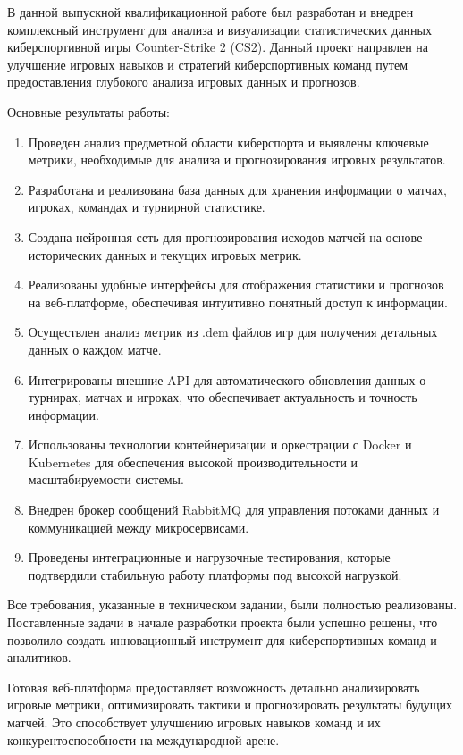 \newsection
{}

В данной выпускной квалификационной работе был разработан и внедрен комплексный инструмент для анализа и визуализации статистических данных киберспортивной игры Counter-Strike 2 (CS2). Данный проект направлен на улучшение игровых навыков и стратегий киберспортивных команд путем предоставления глубокого анализа игровых данных и прогнозов.

Основные результаты работы:

\begin{enumerate}
	\item Проведен анализ предметной области киберспорта и выявлены ключевые метрики, необходимые для анализа и прогнозирования игровых результатов.
	\item Разработана и реализована база данных для хранения информации о матчах, игроках, командах и турнирной статистике.
	\item Создана нейронная сеть для прогнозирования исходов матчей на основе исторических данных и текущих игровых метрик.
	\item Реализованы удобные интерфейсы для отображения статистики и прогнозов на веб-платформе, обеспечивая интуитивно понятный доступ к информации.
	\item Осуществлен анализ метрик из .dem файлов игр для получения детальных данных о каждом матче.
	\item Интегрированы внешние API для автоматического обновления данных о турнирах, матчах и игроках, что обеспечивает актуальность и точность информации.
	\item Использованы технологии контейнеризации и оркестрации с Docker и Kubernetes для обеспечения высокой производительности и масштабируемости системы.
	\item Внедрен брокер сообщений RabbitMQ для управления потоками данных и коммуникацией между микросервисами.
	\item Проведены интеграционные и нагрузочные тестирования, которые подтвердили стабильную работу платформы под высокой нагрузкой.
\end{enumerate}

Все требования, указанные в техническом задании, были полностью реализованы. Поставленные задачи в начале разработки проекта были успешно решены, что позволило создать инновационный инструмент для киберспортивных команд и аналитиков.
	
Готовая веб-платформа предоставляет возможность детально анализировать игровые метрики, оптимизировать тактики и прогнозировать результаты будущих матчей. Это способствует улучшению игровых навыков команд и их конкурентоспособности на международной арене.